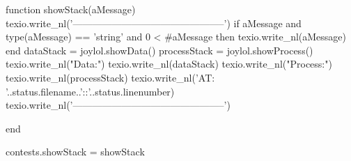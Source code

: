 \def\setJoylolShowStackOff{%
  \directlua{thirddata.joylol.setShowStack(false)}
}

\def\setJoylolShowSpecificationsOn{%
  \directlua{thirddata.joylol.setShowSpecifications(true)}
}

\def\setJoylolShowSpecificationsOff{%
  \directlua{thirddata.joylol.setShowSpecifications(false)}
}

\def\setJoylolCheckingOn{%
  \directlua{thirddata.joylol.setChecking(true)}
}

\def\setJoylolCheckingOff{%
  \directlua{thirddata.joylol.setChecking(false)}
}
\stopMkIVCode

\startLuaCode
function showStack(aMessage) 
  texio.write_nl('-----------------------------------------------')
  if aMessage and type(aMessage) == 'string' and 0 < #aMessage then
    texio.write_nl(aMessage)
  end
  dataStack    = joylol.showData()
  processStack = joylol.showProcess()
  texio.write_nl("Data:")
  texio.write_nl(dataStack)
  texio.write_nl("Process:")
  texio.write_nl(processStack)
  texio.write_nl('AT: '..status.filename..'::'..status.linenumber)
  texio.write_nl('-----------------------------------------------')

end

contests.showStack = showStack
\stopLuaCode
